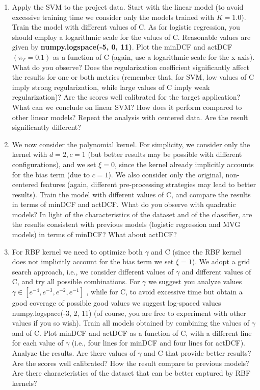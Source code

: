 \documentclass[a4paper, 12pt, english]{article}
\begin{document}
    \begin{enumerate}
        \item Apply the SVM to the project data. Start with the linear model (to avoid excessive training time we consider only the models trained with \(K = 1.0\)). Train the model with different values of C. As for logistic regression, you should employ a logarithmic scale for the values of C. Reasonable values are given by \textbf{numpy.logspace(-5, 0, 11)}. Plot the minDCF and actDCF \((\pi_T = 0.1)\) as a function of C (again, use a logarithmic scale for the x-axis). What do you observe? Does the regularization coefficient significantly affect the results for one or both metrics (remember that, for SVM, low values of C imply strong regularization, while large values of C imply weak regularization)? Are the scores well calibrated for the target application? What can we conclude on linear SVM? How does it perform compared to other linear models? Repeat the analysis with centered data. Are the result significantly different?
        \item We now consider the polynomial kernel. For simplicity, we consider only the kernel with \(d = 2,c = 1\) (but better results may be possible with different configurations), and we set \(\xi = 0\), since the kernel already implicitly accounts for the bias term (due to \(c = 1\)). We also consider only the original, non-centered features (again, different pre-processing strategies may lead to better results). Train the model with different values of C, and compare the results in terms of minDCF and actDCF. What do you observe with quadratic models? In light of the characteristics of the dataset and of the classifier, are the results consistent with previous models (logistic regression and MVG models) in terms of minDCF? What about actDCF?
        \item For RBF kernel we need to optimize both \(\gamma\) and C (since the RBF kernel does not implicitly account for the bias term we set \(\xi = 1\)). We adopt a grid search approach, i.e., we consider different values of \(\gamma\) and different values of C, and try all possible combinations. For \(\gamma\) we suggest you analyze values \(\gamma \in [e^{-4},e^{-3},e^{-2},e^{-1}]\) , while for C, to avoid excessive time but obtain a good coverage of possible good values we suggest log-spaced values numpy.logspace(-3, 2, 11) (of course, you are free to experiment with other values if you so wish). Train all models obtained by combining the values of \(\gamma\) and of C. Plot minDCF and actDCF as a function of C, with a different line for each value of \(\gamma\) (i.e., four lines for minDCF and four lines for actDCF). Analyze the results. Are there values of \(\gamma\) and C that provide better results? Are the scores well calibrated? How the result compare to previous models? Are there characteristics of the dataset that can be better captured by RBF kernels?
    \end{enumerate}
\end{document}
